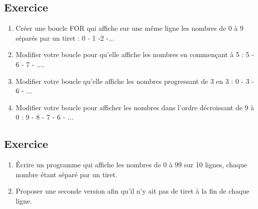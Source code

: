 \documentclass[11pt,a4paper]{article}
\newcounter{numexo}
\begin{document}
\addtocounter{numexo}{1}
\subsection*{\Large Exercice \thenumexo }
\begin{enumerate}
\item Créer une boucle FOR qui affiche sur une même ligne les nombres de 0 à 9 séparés par un tiret : 0 - 1 -2 -...
\item Modifier votre boucle pour qu'elle affiche les nombres en commençant à 5 : 5 - 6 - 7 - ....
\item Modifier votre boucle qu'elle affiche les nombres progressant de 3 en 3 : 0 - 3 - 6 - ...
\item Modifier votre boucle pour afficher les nombres dans l'ordre décroissant de 9 à 0 : 9 - 8 - 7 - 6 - ...
\end{enumerate}

\addtocounter{numexo}{1}
\subsection*{\Large Exercice \thenumexo }
\begin{enumerate}
\item Écrire un programme qui affiche les nombres de 0 à 99 sur 10 lignes, chaque nombre étant séparé par un tiret.
\item Proposer une seconde version afin qu'il n'y ait pas de tiret à la fin de chaque ligne.
\end{enumerate}

\newpage
\addtocounter{numexo}{1}
\end{document}
